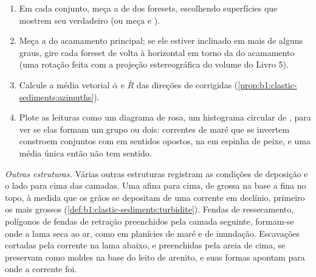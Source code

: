 \begin{method}\label{met:b1:clastic-sediments:palaeocurrent}
\begin{enumerate}
  \item Em cada conjunto, meça a  de  dos foresets, escolhendo superfícies que mostrem seu verdadeiro  (ou meça  e ).
  \item Meça a  do acamamento principal; se ele estiver inclinado em mais de alguns graus, gire cada foreset de volta à horizontal em torno da  do acamamento (uma rotação feita com a projeção estereográfica do volume do Livro 5).
  \item Calcule a média vetorial $\bar\alpha$ e $\bar R$ das direções de  corrigidas (\cref{prop:b1:clastic-sediments:azimuths}).
  \item Plote as leituras como um diagrama de rosa, um histograma circular de , para ver se elas formam um grupo ou dois: correntes de maré que se invertem constroem conjuntos com  em sentidos opostos, na  em espinha de peixe, e uma média única então não tem sentido.
\end{enumerate}
\end{method}

\emph{Outras estruturas.} Várias outras estruturas registram as condições de deposição e o lado para cima das camadas. Uma  afina para cima, de grossa na base a fina no topo, à medida que os grãos se depositam de uma corrente em declínio, primeiro os mais grossos (\cref{def:b1:clastic-sediments:turbidite}). Fendas de ressecamento, polígonos de fendas de retração preenchidos pela camada seguinte, formam-se onde a lama seca ao ar, como em planícies de maré e de inundação. Escavações cortadas pela corrente na lama abaixo, e preenchidas pela areia de cima, se preservam como moldes na base do leito de arenito, e suas formas apontam para onde a corrente foi.

